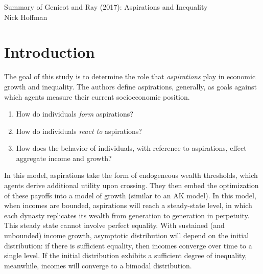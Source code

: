 \documentclass[11pt]{article}
\begin{document}
\begin{flushleft}
    Summary of Genicot and Ray (2017): Aspirations and Inequality \\
    Nick Hoffman \\
\end{flushleft}
    \section{Introduction}
    The goal of this study is to determine the role that \textit{aspirations} play in economic growth and inequality. The authors define aspirations, generally, as goals against which agents measure their current socioeconomic position. %
    \begin{enumerate}
        \item How do individuals \textit{form} aspirations?
        \item How do individuals \textit{react to} aspirations?
        \item How does the behavior of individuals, with reference to aspirations, effect aggregate income and growth?
    \end{enumerate}
    In this model, aspirations take the form of endogeneous wealth thresholds, which agents derive additional utility upon crossing. They then embed the optimization of these payoffs into a model of growth (similar to an AK model). In this model, when incomes are bounded, aspirations will reach a steady-state level, in which each dynasty replicates its wealth from generation to generation in perpetuity. This steady state cannot involve perfect equality. With sustained (and unbounded) income growth, asymptotic distribution will depend on the initial distribution: if there is sufficient equality, then incomes converge over time to a single level. If the initial distribution exhibits a sufficient degree of inequality, meanwhile, incomes will converge to a bimodal distribution. 
\end{document}
